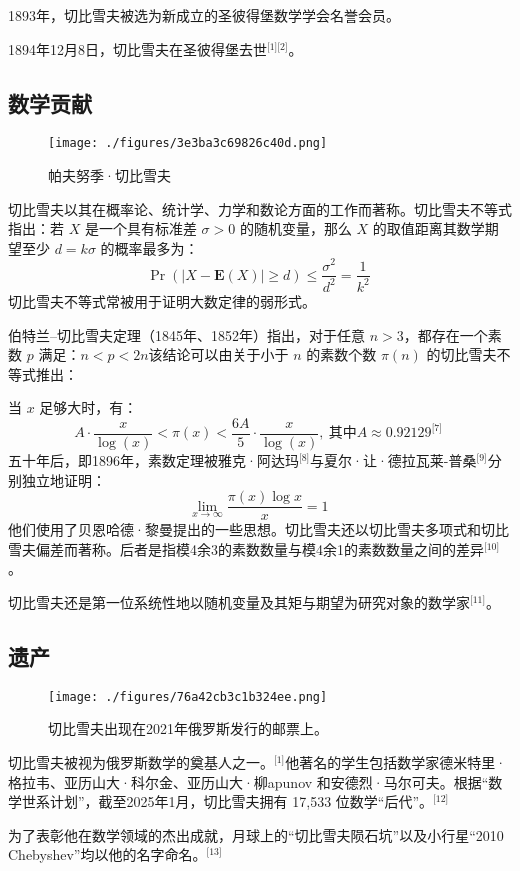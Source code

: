 1893年，切比雪夫被选为新成立的圣彼得堡数学学会名誉会员。

1894年12月8日，切比雪夫在圣彼得堡去世\(^\text{[1][2]}\)。
\subsection{数学贡献}
\begin{figure}[ht]
\centering
\texttt{[image: ./figures/3e3ba3c69826c40d.png]}
\caption{帕夫努季·切比雪夫} \label{fig_PFNJ_2}
\end{figure}
切比雪夫以其在概率论、统计学、力学和数论方面的工作而著称。切比雪夫不等式指出：若 $X$ 是一个具有标准差 $\sigma > 0$ 的随机变量，那么 $X$ 的取值距离其数学期望至少 $d = k\sigma$ 的概率最多为：
$$
\Pr(|X - \mathbf{E}(X)| \geq d) \leq \frac{\sigma^2}{d^2} = \frac{1}{k^2}~
$$
切比雪夫不等式常被用于证明大数定律的弱形式。

伯特兰–切比雪夫定理（1845年、1852年）指出，对于任意 $n > 3$，都存在一个素数 $p$ 满足：$n < p < 2n$该结论可以由关于小于 $n$ 的素数个数 $\pi(n)$ 的切比雪夫不等式推出：

当 $x$ 足够大时，有：
$$
A \cdot \frac{x}{\log(x)} < \pi(x) < \frac{6A}{5} \cdot \frac{x}{\log(x)},\ \text{其中}A \approx 0.92129^\text{[7]}~
$$
五十年后，即1896年，素数定理被雅克·阿达玛\(^\text{[8]}\)与夏尔·让·德拉瓦莱-普桑\(^\text{[9]}\)分别独立地证明：
$$
\lim_{x \to \infty} \frac{\pi(x) \log x}{x} = 1~
$$
他们使用了贝恩哈德·黎曼提出的一些思想。切比雪夫还以切比雪夫多项式和切比雪夫偏差而著称。后者是指模4余3的素数数量与模4余1的素数数量之间的差异\(^\text{[10]}\)。

切比雪夫还是第一位系统性地以随机变量及其矩与期望为研究对象的数学家\(^\text{[11]}\)。
\subsection{遗产}
\begin{figure}[ht]
\centering
\texttt{[image: ./figures/76a42cb3c1b324ee.png]}
\caption{切比雪夫出现在2021年俄罗斯发行的邮票上。} \label{fig_PFNJ_3}
\end{figure}
切比雪夫被视为俄罗斯数学的奠基人之一。\(^\text{[1]}\)他著名的学生包括数学家德米特里·格拉韦、亚历山大·科尔金、亚历山大·柳apunov 和安德烈·马尔可夫。根据“数学世系计划”，截至2025年1月，切比雪夫拥有 17,533 位数学“后代”。\(^\text{[12]}\)

为了表彰他在数学领域的杰出成就，月球上的“切比雪夫陨石坑”以及小行星“2010 Chebyshev”均以他的名字命名。\(^\text{[13]}\)

